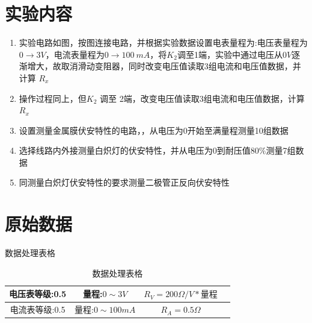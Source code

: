 \documentclass[UTF8]{ctexart}
\title{}
\author{}
\date{}
\begin{document}
\begin{titlepage}		
		
\end{titlepage}

\section{实验内容}
\begin{enumerate}
    \item 实验电路如图，按图连接电路，并根据实验数据设置电表量程为:电压表量程为$0\to 3V$，电流表量程为$0 \to 100 \ mA$，将$K_2$调至1端，实验中通过电压从0$V$逐渐增大，故取消滑动变阻器，同时改变电压值读取3组电流和电压值数据，并计算 $R_x$
    \item 操作过程同上，但$K_2$ 调至 2端，改变电压值读取3组电流和电压值数据，计算$R_x$
    \item 设置测量金属膜伏安特性的电路，，从电压为0开始至满量程测量10组数据
    \item 选择线路内外接测量白炽灯的伏安特性，并从电压为0到耐压值$80\%$测量7组数据
    \item 同测量白炽灯伏安特性的要求测量二极管正反向伏安特性
\end{enumerate}

\vspace{4cm}

\section{原始数据}

数据处理表格 
\begin{table}[H]
    \centering
    \caption{数据处理表格}
    \begin{tabular}{|c|c|c|c|}
    \hline
        电压表等级:0.5 &  量程:$0 \sim3V$   &  $R_V =  200\Omega/V * \text{量程}$\\
    \hline
        电流表等级:0.5 &  量程:$0 \sim 100mA$ &  $R_A = 0.5 \Omega$ \\
    \hline
    \end{tabular}

\end{table}
\end{document}
